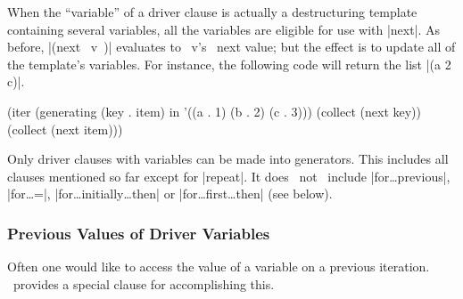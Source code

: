 When the ``variable'' of a driver clause is actually a destructuring
template containing several variables, all the variables are eligible
for use with |next|.  As before, |(next ~v~)| evaluates to ~v's~ next
value; but the effect is to update all of the template's variables.
For instance, the following code will return the list |(a 2 c)|.
\begin{program}
(iter (generating (key . item) in '((a . 1) (b . 2) (c . 3)))
      (collect (next key))
      (collect (next item)))
\end{program}

Only driver clauses with variables can be made into generators.  This
includes all clauses mentioned so far except for |repeat|.  It does
~not~ include |for\dots previous|, |for\dots =|,
|for\dots initially\dots then| or |for\dots first\dots then| (see
below). 

\subsubsection{Previous Values of Driver Variables}

Often one would like to access the value of a variable on a previous
iteration.  \iter\ provides a special clause for accomplishing this.

